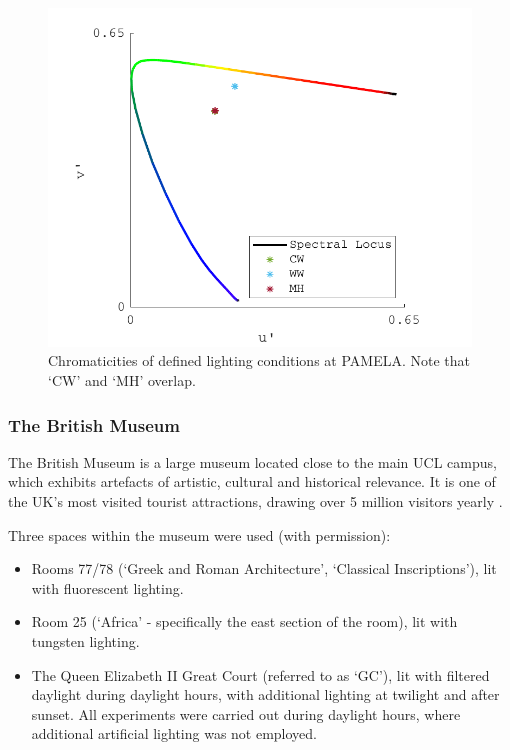 \begin{figure}[hbtp]
\includegraphics[max width=\textwidth]{figs/tablet/PAMELA_chromaticities.pdf}
\caption{Chromaticities of defined lighting conditions at \gls{PAMELA}. Note that `CW' and `MH' overlap.}
\label{fig:PAMELAlights6}
\end{figure}

\subsubsection{The British Museum} \label{sec:BM}

The British Museum is a large museum located close to the main \gls{UCL} campus, which exhibits artefacts of artistic, cultural and historical relevance. It is one of the UK's most visited tourist attractions, drawing over 5 million visitors yearly \citep{simon_calder_tate_2019}.

\medskip \noindent
Three spaces within the museum were used (with permission):

\begin{itemize}
    \item Rooms 77/78 (`Greek and Roman Architecture', `Classical Inscriptions'), lit with fluorescent lighting.
    \item Room 25 (`Africa' - specifically the east section of the room), lit with tungsten  lighting.
    \item The Queen Elizabeth II Great Court (referred to as `GC'), lit with filtered daylight \citep{foster_and_partners_london._great_2002} during daylight hours, with additional lighting at twilight and after sunset. All experiments were carried out during daylight hours, where additional artificial lighting was not employed.
\end{itemize}

